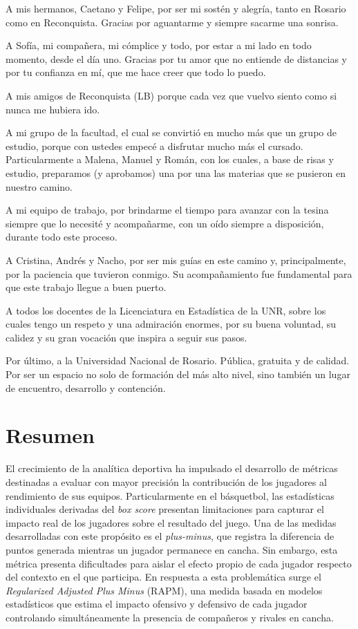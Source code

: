 \documentclass[
  12pt,
]{article}
\begin{document}
A mis hermanos, Caetano y Felipe, por ser mi sostén y alegría, tanto en
Rosario como en Reconquista. Gracias por aguantarme y siempre sacarme
una sonrisa.

A Sofía, mi compañera, mi cómplice y todo, por estar a mi lado en todo
momento, desde el día uno. Gracias por tu amor que no entiende de
distancias y por tu confianza en mí, que me hace creer que todo lo
puedo.

A mis amigos de Reconquista (LB) porque cada vez que vuelvo siento como
si nunca me hubiera ido.

A mi grupo de la facultad, el cual se convirtió en mucho más que un
grupo de estudio, porque con ustedes empecé a disfrutar mucho más el
cursado. Particularmente a Malena, Manuel y Román, con los cuales, a
base de risas y estudio, preparamos (y aprobamos) una por una las
materias que se pusieron en nuestro camino.

A mi equipo de trabajo, por brindarme el tiempo para avanzar con la
tesina siempre que lo necesité y acompañarme, con un oído siempre a
disposición, durante todo este proceso.

A Cristina, Andrés y Nacho, por ser mis guías en este camino y,
principalmente, por la paciencia que tuvieron conmigo. Su acompañamiento
fue fundamental para que este trabajo llegue a buen puerto.

A todos los docentes de la Licenciatura en Estadística de la UNR, sobre
los cuales tengo un respeto y una admiración enormes, por su buena
voluntad, su calidez y su gran vocación que inspira a seguir sus pasos.

Por último, a la Universidad Nacional de Rosario. Pública, gratuita y de
calidad. Por ser un espacio no solo de formación del más alto nivel,
sino también un lugar de encuentro, desarrollo y contención.

\newpage

\section*{Resumen}\label{resumen}

El crecimiento de la analítica deportiva ha impulsado el desarrollo de
métricas destinadas a evaluar con mayor precisión la contribución de los
jugadores al rendimiento de sus equipos. Particularmente en el
básquetbol, las estadísticas individuales derivadas del \emph{box score}
presentan limitaciones para capturar el impacto real de los jugadores
sobre el resultado del juego. Una de las medidas desarrolladas con este
propósito es el \emph{plus-minus}, que registra la diferencia de puntos
generada mientras un jugador permanece en cancha. Sin embargo, esta
métrica presenta dificultades para aislar el efecto propio de cada
jugador respecto del contexto en el que participa. En respuesta a esta
problemática surge el \emph{Regularized Adjusted Plus Minus} (RAPM), una
medida basada en modelos estadísticos que estima el impacto ofensivo y
defensivo de cada jugador controlando simultáneamente la presencia de
compañeros y rivales en cancha.
\end{document}
